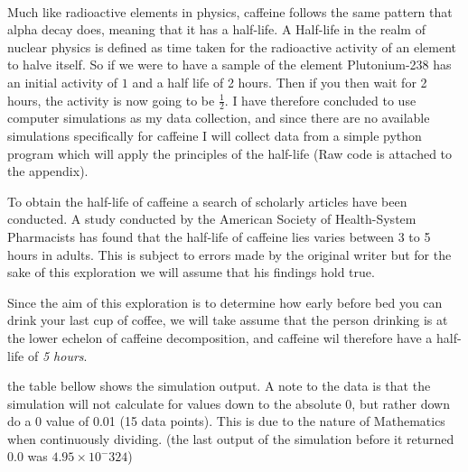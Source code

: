 \documentclass[12pt]{article}
\begin{document}
        \paragraph{}
                Much like radioactive elements in physics, caffeine follows the same pattern that alpha decay does, meaning that it has a half-life. A Half-life in the realm of nuclear physics is defined as time taken for the radioactive activity of an element to halve itself. So if we were to have a sample of the element Plutonium-238 has an initial activity of $1$ and a half life of 2 hours. Then if you then wait for 2 hours, the activity is now going to be {$\frac{1}{2}$}. I have therefore concluded to use computer simulations as my data collection, and since there are no available simulations specifically for caffeine I will collect data from a simple python program which will apply the principles of the half-life (Raw code is attached to the appendix). 

                \noindent To obtain the half-life of caffeine a search of scholarly articles have been conducted. A study conducted by the American Society of Health-System Pharmacists has found that the half-life of caffeine lies varies between 3 to 5 hours in adults. This is subject to errors made by the original writer but for the sake of this exploration we will assume that his findings hold true. 
                
                \noindent
                Since the aim of this exploration is to determine how early before bed you can drink your last cup of coffee, we will take assume that the person drinking is at the lower echelon of caffeine decomposition, and caffeine wil therefore have a half-life of \textit{5 hours}. 
                
                \noindent the table bellow shows the simulation output. A note to the data is that the simulation will not calculate for values down to the absolute 0, but rather down do a 0 value of 0.01 (15 data points). This is due to the nature of Mathematics when continuously dividing. (the last output of the simulation before it returned 0.0 was $4.95\times 10^-324$)
\end{document}
